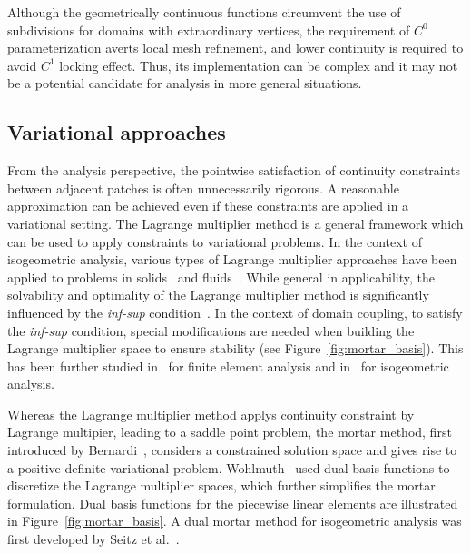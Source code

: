 Although the geometrically continuous functions circumvent the use of subdivisions for domains with extraordinary vertices, the requirement of $C^0$ parameterization averts local mesh refinement, and lower continuity is required to avoid $C^1$ locking effect. Thus, its implementation can be complex and it may not be a potential candidate for analysis in more general situations.\par

\subsection{Variational approaches}

From the analysis perspective, the pointwise satisfaction of continuity constraints between adjacent patches is often unnecessarily rigorous. A reasonable approximation can be achieved even if these constraints are applied in a variational setting. The Lagrange multiplier method is a general framework which can be used to apply constraints to variational problems. In the context of isogeometric analysis, various types of Lagrange multiplier approaches have been applied to problems in solids~\cite{hesch_isogeometric_2012, seitz2016isogeometric} and fluids~\cite{bazilevs2012isogeometric}. While general in applicability, the solvability and optimality of the Lagrange multiplier method is significantly influenced by the \textit{inf-sup} condition~\cite{babuvska1973finite,boffi_mixed_2013}. In the context of domain coupling, to satisfy the \textit{inf-sup} condition, special modifications are needed when building the Lagrange multiplier space to ensure stability (see Figure~\ref{fig:mortar_basis}). This has been further studied in~\cite{bernardi_basics_2005, bernardi_domain_1993, belgacem_mortar_1998, barbosa1991finite} for finite element analysis and in~\cite{brivadis_isogeometric_2015} for isogeometric analysis. \par

Whereas the Lagrange multiplier method applys continuity constraint by Lagrange multipier, leading to a saddle point problem, the mortar method, first introduced by Bernardi~\cite{bernardi_domain_1993}, considers a constrained solution space and gives rise to a positive definite variational problem. Wohlmuth~\cite{wohlmuth2000mortar} used dual basis functions to discretize the Lagrange multiplier spaces, which further simplifies the mortar formulation. Dual basis functions for the piecewise linear elements are illustrated in Figure~\ref{fig:mortar_basis}. A dual mortar method for isogeometric analysis was first developed by Seitz et al.~\cite{seitz_isogeometric_2016}. \par


